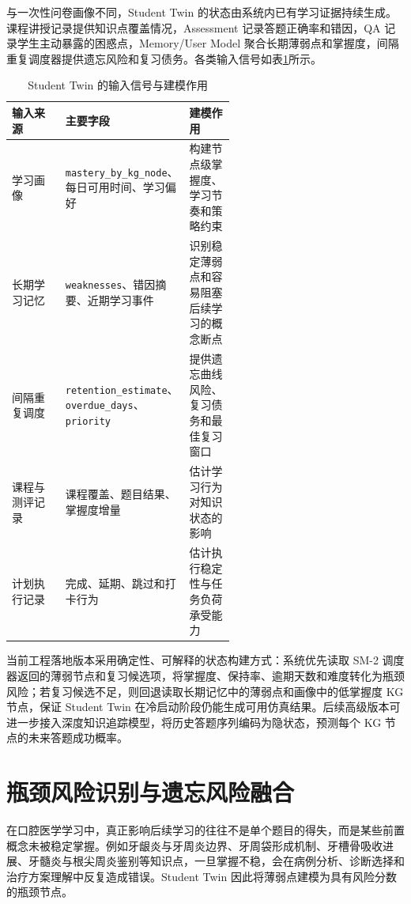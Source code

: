 与一次性问卷画像不同，Student Twin 的状态由系统内已有学习证据持续生成。课程讲授记录提供知识点覆盖情况，Assessment 记录答题正确率和错因，QA 记录学生主动暴露的困惑点，Memory/User Model 聚合长期薄弱点和掌握度，间隔重复调度器提供遗忘风险和复习债务。各类输入信号如表\ref{tab:student-twin-inputs}所示。

\begin{table}[H]
  \centering
  \caption{Student Twin 的输入信号与建模作用}
  \label{tab:student-twin-inputs}
  \begin{tabularx}{\linewidth}{p{0.24\linewidth}p{0.32\linewidth}X}
    \toprule
    输入来源 & 主要字段 & 建模作用 \\
    \midrule
    学习画像 & \texttt{mastery\_by\_kg\_node}、每日可用时间、学习偏好 & 构建节点级掌握度、学习节奏和策略约束 \\
    长期学习记忆 & \texttt{weaknesses}、错因摘要、近期学习事件 & 识别稳定薄弱点和容易阻塞后续学习的概念断点 \\
    间隔重复调度 & \texttt{retention\_estimate}、\texttt{overdue\_days}、\texttt{priority} & 提供遗忘曲线风险、复习债务和最佳复习窗口 \\
    课程与测评记录 & 课程覆盖、题目结果、掌握度增量 & 估计学习行为对知识状态的影响 \\
    计划执行记录 & 完成、延期、跳过和打卡行为 & 估计执行稳定性与任务负荷承受能力 \\
    \bottomrule
  \end{tabularx}
\end{table}

当前工程落地版本采用确定性、可解释的状态构建方式：系统优先读取 SM-2 调度器返回的薄弱节点和复习候选项，将掌握度、保持率、逾期天数和难度转化为瓶颈风险；若复习候选不足，则回退读取长期记忆中的薄弱点和画像中的低掌握度 KG 节点，保证 Student Twin 在冷启动阶段仍能生成可用仿真结果。后续高级版本可进一步接入深度知识追踪模型，将历史答题序列编码为隐状态，预测每个 KG 节点的未来答题成功概率\cite{corbett1994knowledge,piech2015deep}。

\section{瓶颈风险识别与遗忘风险融合}

在口腔医学学习中，真正影响后续学习的往往不是单个题目的得失，而是某些前置概念未被稳定掌握。例如牙龈炎与牙周炎边界、牙周袋形成机制、牙槽骨吸收进展、牙髓炎与根尖周炎鉴别等知识点，一旦掌握不稳，会在病例分析、诊断选择和治疗方案理解中反复造成错误。Student Twin 因此将薄弱点建模为具有风险分数的瓶颈节点。


